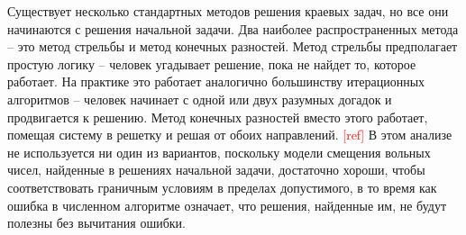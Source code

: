 \documentclass[A4,12pt,oneside]{article}
\renewcommand{\(}{\left(}
\renewcommand{\)}{\right)}
\newcommand{\citeph}{\textcolor{red}{[ref] }}
\begin{document}
Существует несколько стандартных методов решения краевых задач, но все они начинаются с решения начальной задачи. Два наиболее распространенных метода -- это метод стрельбы и метод конечных разностей. Метод стрельбы предполагает простую логику -- человек угадывает решение, пока не найдет то, которое работает. На практике это работает аналогично большинству итерационных алгоритмов -- человек начинает с одной или двух разумных догадок и продвигается к решению. Метод конечных разностей вместо этого работает, помещая систему в решетку и решая от обоих направлений. \citeph В этом анализе не используется ни один из вариантов, поскольку модели смещения вольных чисел, найденные в решениях начальной задачи, достаточно хороши, чтобы соответствовать граничным условиям в пределах допустимого, в то время как ошибка в численном алгоритме означает, что решения, найденные им, не будут полезны без вычитания ошибки.
\end{document}
